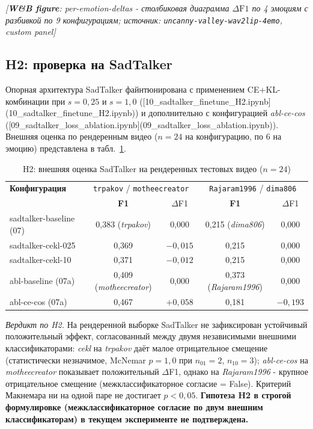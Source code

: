 \documentclass[a4paper, 12pt, oneside, openany]{article}
\begin{document}
\begin{center}
\textit{[\textbf{W\&B figure}: per-emotion-deltas - столбиковая диаграмма $\Delta\mathrm{F1}$ по 4 эмоциям с разбивкой по 9 конфигурациям; источник: \texttt{uncanny-valley-wav2lip-4emo}, custom panel]}
\end{center}

\subsection{H2: проверка на SadTalker}

Опорная архитектура SadTalker файнтюнирована с применением CE+KL-комбинации при $s=0{,}25$ и $s=1{,}0$ ([10\_sadtalker\_finetune\_H2.ipynb](10\_sadtalker\_finetune\_H2.ipynb)) и дополнительно с конфигурацией \textit{abl-ce-cos} ([09\_sadtalker\_loss\_ablation.ipynb](09\_sadtalker\_loss\_ablation.ipynb)). Внешняя оценка по рендеренным видео ($n=24$ на конфигурацию, по 6 на эмоцию) представлена в табл.~\ref{tab:h2_test}.

\begin{table}[H]
\caption{H2: внешняя оценка SadTalker на рендеренных тестовых видео ($n=24$)}
\label{tab:h2_test}
\centering
\small
\begin{tabular}{|p{4cm}|c|c|c|c|}
\hline
\textbf{Конфигурация} & \multicolumn{2}{c|}{\texttt{trpakov} / \texttt{motheecreator}} & \multicolumn{2}{c|}{\texttt{Rajaram1996} / \texttt{dima806}} \\
 & \textbf{F1} & $\Delta$F1 & \textbf{F1} & $\Delta$F1 \\
\hline
sadtalker-baseline (07) & 0,383 (\textit{trpakov}) & 0,000 & 0,215 (\textit{dima806}) & 0,000 \\
\hline
sadtalker-cekl-025 & 0,369 & $-0,015$ & 0,215 & 0,000 \\
\hline
sadtalker-cekl-10 & 0,371 & $-0,012$ & 0,215 & 0,000 \\
\hline
abl-baseline (07a) & 0,409 (\textit{motheecreator}) & 0,000 & 0,373 (\textit{Rajaram1996}) & 0,000 \\
\hline
abl-ce-cos (07a) & 0,467 & $+0,058$ & 0,181 & $-0,193$ \\
\hline
\end{tabular}
\end{table}

\textit{Вердикт по H2.} На рендеренной выборке SadTalker не зафиксирован устойчивый положительный эффект, согласованный между двумя независимыми внешними классификаторами: \textit{cekl} на \textit{trpakov} даёт малое отрицательное смещение (статистически незначимое, McNemar $p=1{,}0$ при $n_{01}=2$, $n_{10}=3$); \textit{abl-ce-cos} на \textit{motheecreator} показывает положительный $\Delta$F1, однако на \textit{Rajaram1996} - крупное отрицательное смещение (межклассификаторное согласие = False). Критерий Макнемара ни на одной паре не достигает $p<0{,}05$. \textbf{Гипотеза H2 в строгой формулировке (межклассификаторное согласие по двум внешним классификаторам) в текущем эксперименте не подтверждена.}
\end{document}
